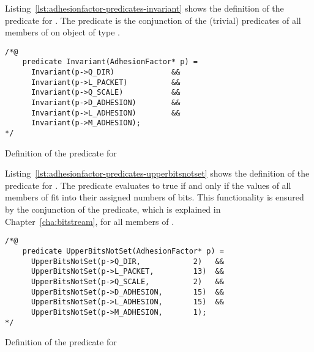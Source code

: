 \FloatBarrier

\label{sec:adhesionfactor-predicates-invariant}

Listing~\ref{lst:adhesionfactor-predicates-invariant} shows the definition of the
 predicate for .
The predicate is the conjunction of the (trivial)  predicates
of all members of on object of type .

\begin{listing}[hbt]
\begin{minipage}{0.99\textwidth}
\begin{lstlisting}[style=acsl-block]
/*@
    predicate Invariant(AdhesionFactor* p) =
      Invariant(p->Q_DIR)             &&
      Invariant(p->L_PACKET)          &&
      Invariant(p->Q_SCALE)           &&
      Invariant(p->D_ADHESION)        &&
      Invariant(p->L_ADHESION)        &&
      Invariant(p->M_ADHESION);
*/
\end{lstlisting}
\end{minipage}
\caption{\label{lst:adhesionfactor-predicates-invariant}Definition of the  predicate for }
\end{listing}

\FloatBarrier

\label{sec:adhesionfactor-predicates-upperbitsnotset}


Listing~\ref{lst:adhesionfactor-predicates-upperbitsnotset} shows the definition
of the  predicate for .
The predicate  evaluates to true
if and only if the values of all members of 
fit into their assigned numbers of bits.
This functionality is ensured by the conjunction of the  predicate,
which is explained in Chapter~\ref{cha:bitstream}, for all members of .

\begin{listing}[hbt]
\begin{minipage}{0.99\textwidth}
\begin{lstlisting}[style=acsl-block]
/*@
    predicate UpperBitsNotSet(AdhesionFactor* p) =
      UpperBitsNotSet(p->Q_DIR,            2)   &&
      UpperBitsNotSet(p->L_PACKET,         13)  &&
      UpperBitsNotSet(p->Q_SCALE,          2)   &&
      UpperBitsNotSet(p->D_ADHESION,       15)  &&
      UpperBitsNotSet(p->L_ADHESION,       15)  &&
      UpperBitsNotSet(p->M_ADHESION,       1);
*/
\end{lstlisting}
\end{minipage}
\caption{\label{lst:adhesionfactor-predicates-upperbitsnotset}Definition of the  predicate for }
\end{listing}

